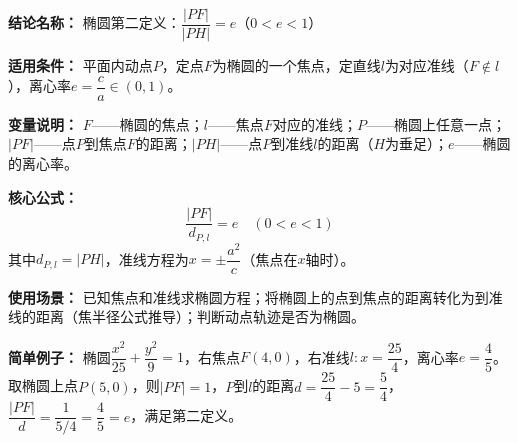 \textbf{结论名称：} 椭圆第二定义：$\dfrac{|PF|}{|PH|}=e$（$0<e<1$）

\textbf{适用条件：} 平面内动点$P$，定点$F$为椭圆的一个焦点，定直线$l$为对应准线（$F\notin l$），离心率$e=\dfrac{c}{a}\in(0,1)$。

\textbf{变量说明：} $F$——椭圆的焦点；$l$——焦点$F$对应的准线；$P$——椭圆上任意一点；$|PF|$——点$P$到焦点$F$的距离；$|PH|$——点$P$到准线$l$的距离（$H$为垂足）；$e$——椭圆的离心率。

\textbf{核心公式：}
\[
\boxed{\frac{|PF|}{d_{P,l}} = e \quad (0<e<1)}
\]
其中$d_{P,l}=|PH|$，准线方程为$x=\pm\dfrac{a^2}{c}$（焦点在$x$轴时）。

\textbf{使用场景：} 已知焦点和准线求椭圆方程；将椭圆上的点到焦点的距离转化为到准线的距离（焦半径公式推导）；判断动点轨迹是否为椭圆。

\textbf{简单例子：} 椭圆$\dfrac{x^2}{25}+\dfrac{y^2}{9}=1$，右焦点$F(4,0)$，右准线$l:x=\dfrac{25}{4}$，离心率$e=\dfrac{4}{5}$。取椭圆上点$P(5,0)$，则$|PF|=1$，$P$到$l$的距离$d=\dfrac{25}{4}-5=\dfrac{5}{4}$，$\dfrac{|PF|}{d}= \dfrac{1}{5/4}= \dfrac{4}{5}=e$，满足第二定义。